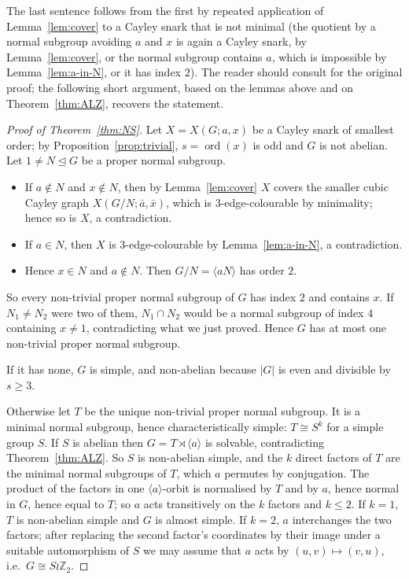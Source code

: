 \documentclass[11pt,a4paper]{article}
\theoremstyle{definition}
\theoremstyle{remark}
\newcommand{\ord}{\operatorname{ord}}
\newcommand{\ZZ}{\mathbb{Z}}
\newcommand{\X}[3]{X(#1;#2,#3)}
\begin{document}
The last sentence follows from the first by repeated application of Lemma~\ref{lem:cover} to a Cayley snark that is not minimal (the quotient by a normal subgroup avoiding $a$ and $x$ is again a Cayley snark, by Lemma~\ref{lem:cover}, or the normal subgroup contains $a$, which is impossible by Lemma~\ref{lem:a-in-N}, or it has index $2$).  The reader should consult \cite{NS01} for the original proof; the following short argument, based on the lemmas above and on Theorem~\ref{thm:ALZ}, recovers the statement.

\begin{proof}[Proof of Theorem~\ref{thm:NS}]
Let $X=\X{G}{a}{x}$ be a Cayley snark of smallest order; by Proposition~\ref{prop:trivial}, $s=\ord(x)$ is odd and $G$ is not abelian.  Let $1\ne N\trianglelefteq G$ be a proper normal subgroup.
\begin{itemize}[leftmargin=2em]
\item If $a\notin N$ and $x\notin N$, then by Lemma~\ref{lem:cover} $X$ covers the smaller cubic Cayley graph $\X{G/N}{\bar a}{\bar x}$, which is $3$-edge-colourable by minimality; hence so is $X$, a contradiction.
\item If $a\in N$, then $X$ is $3$-edge-colourable by Lemma~\ref{lem:a-in-N}, a contradiction.
\item Hence $x\in N$ and $a\notin N$.  Then $G/N=\langle aN\rangle$ has order $2$.
\end{itemize}
So every non-trivial proper normal subgroup of $G$ has index $2$ and contains $x$.  If $N_1\ne N_2$ were two of them, $N_1\cap N_2$ would be a normal subgroup of index $4$ containing $x\ne1$, contradicting what we just proved.  Hence $G$ has at most one non-trivial proper normal subgroup.

If it has none, $G$ is simple, and non-abelian because $|G|$ is even and divisible by $s\ge3$.

Otherwise let $T$ be the unique non-trivial proper normal subgroup.  It is a minimal normal subgroup, hence characteristically simple: $T\cong S^k$ for a simple group $S$.  If $S$ is abelian then $G=T\rtimes\langle a\rangle$ is solvable, contradicting Theorem~\ref{thm:ALZ}.  So $S$ is non-abelian simple, and the $k$ direct factors of $T$ are the minimal normal subgroups of $T$, which $a$ permutes by conjugation.  The product of the factors in one $\langle a\rangle$-orbit is normalised by $T$ and by $a$, hence normal in $G$, hence equal to $T$; so $a$ acts transitively on the $k$ factors and $k\le2$.  If $k=1$, $T$ is non-abelian simple and $G$ is almost simple.  If $k=2$, $a$ interchanges the two factors; after replacing the second factor's coordinates by their image under a suitable automorphism of $S$ we may assume that $a$ acts by $(u,v)\mapsto(v,u)$, i.e.\ $G\cong S\wr\ZZ_2$.
\end{proof}
\end{document}
